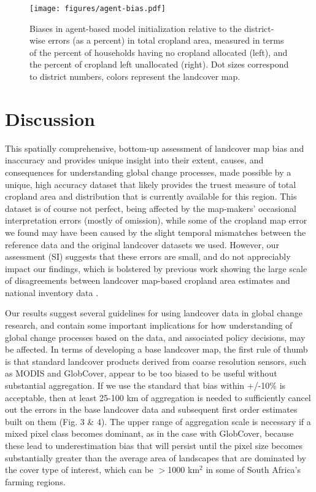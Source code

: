 \documentclass{pnastwo}
\begin{document}
\begin{article}
\begin{figure}[!ht]
\centerline{\texttt{[image: figures/agent-bias.pdf]}}
\caption{Biases in agent-based model initialization relative to the district-wise errors (as a percent) in total cropland area, measured in terms of the percent of households having no cropland allocated (left), and the percent of cropland left unallocated (right). Dot sizes correspond to district numbers, colors represent the landcover map.}
\label{afoto}
\end{figure}

\section{Discussion}
This spatially comprehensive, bottom-up assessment of landcover map bias and inaccuracy and provides unique insight into their extent, causes, and consequences for understanding global change processes, made possible by a unique, high accuracy dataset that likely provides the truest measure of total cropland area and distribution that is currently available for this region. This dataset is of course not perfect, being affected by the map-makers' occasional interpretation errors (mostly of omission), while some of the cropland map error we found may have been caused by the slight temporal mismatches between the reference data and the original landcover datasets we used. However, our assessment (SI) suggests that these errors are small, and do not appreciably impact our findings, which is bolstered by previous work showing the large scale of disagreements between landcover map-based cropland area estimates and national inventory data \cite{fritz_comparison_2010}.

Our results suggest several guidelines for using landcover data in global change research, and contain some important implications for how understanding of global change processes based on the data, and associated policy decisions, may be affected. In terms of developing a base landcover map, the first rule of thumb is that standard landcover products derived from coarse resolution sensors, such as MODIS and GlobCover, appear to be too biased to be useful without substantial aggregation. If we use the standard that bias within +/-10\% is acceptable, then at least 25-100 km of aggregation is needed to sufficiently cancel out the errors in the base landcover data and subsequent first order estimates built on them (Fig. 3 \& 4). The upper range of aggregation scale is necessary if a mixed pixel class becomes dominant, as in the case with GlobCover, because these lead to underestimation bias that will persist until the pixel size becomes substantially greater than the average area of landscapes that are dominated by the cover type of interest, which can be $>$1000 km$^2$ in some of South Africa's farming regions. 


\end{article}
\end{document}
